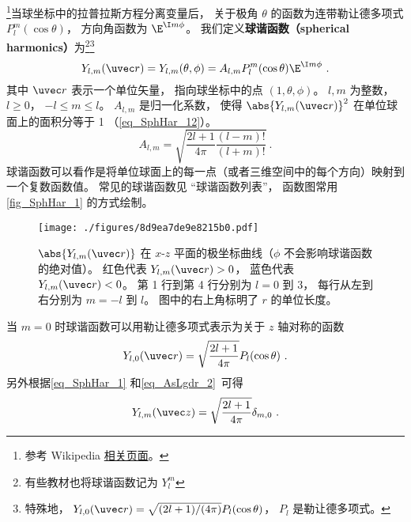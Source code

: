 

\footnote{参考 Wikipedia \href{https://en.wikipedia.org/wiki/Spherical_harmonics}{相关页面}。}当球坐标中的拉普拉斯方程分离变量后， 关于极角 $\theta$ 的函数为连带勒让德多项式 $P_l^m(\cos\theta)$， 方向角函数为 $\E^{\I m\phi}$。 我们定义\textbf{球谐函数（spherical harmonics）}为\footnote{有些教材也将球谐函数记为 $Y_l^m$}\footnote{特殊地， $Y_{l,0}(\uvec r) = \sqrt{(2l + 1)/(4\pi)}P_l(\cos\theta)$， $P_l$ 是勒让德多项式。}
\begin{equation}\label{eq_SphHar_1}
Y_{l, m} (\uvec r) = Y_{l, m}(\theta, \phi) = A_{l,m} P_l^m(\cos \theta) \E^{\I m\phi}~.
\end{equation}
其中 $\uvec r$ 表示一个单位矢量， 指向球坐标中的点 $(1, \theta, \phi)$。 $l, m$ 为整数， $l \geqslant 0$， $-l \leqslant m \leqslant l$。 $A_{l,m}$ 是归一化系数， 使得 $\abs{Y_{l, m} (\uvec r)}^2$ 在单位球面上的面积分等于 1 （\autoref{eq_SphHar_12}）。
\begin{equation}\label{eq_SphHar_2}
A_{l,m} =  \sqrt{\frac{2l + 1}{4\pi }\frac{(l - m)!}{(l + m)!}}~.
\end{equation}
球谐函数可以看作是将单位球面上的每一点（或者三维空间中的每个方向）映射到一个复数函数值。 常见的球谐函数见 “球谐函数列表”， 函数图常用\autoref{fig_SphHar_1} 的方式绘制。

\begin{figure}[ht]
\centering
\texttt{[image: ./figures/8d9ea7de9e8215b0.pdf]}
\caption{$\abs{Y_{l,m}(\uvec r)}$ 在 $x$-$z$ 平面的极坐标曲线（$\phi$ 不会影响球谐函数的绝对值）。 红色代表 $Y_{l,m}(\uvec r) > 0$， 蓝色代表 $Y_{l,m}(\uvec r) < 0$。 第 1 行到第 4 行分别为 $l = 0$ 到 $3$， 每行从左到右分别为 $m = -l$ 到 $l$。 图中的右上角标明了 $r$ 的单位长度。} \label{fig_SphHar_1}
\end{figure}

当 $m = 0$ 时球谐函数可以用勒让德多项式表示为关于 $z$ 轴对称的函数
\begin{equation}\label{eq_SphHar_11}
Y_{l,0}(\uvec r) = \sqrt{\frac{2l+1}{4\pi}} P_l(\cos\theta)~.
\end{equation}
另外根据\autoref{eq_SphHar_1} 和\autoref{eq_AsLgdr_2}~可得
\begin{equation}
Y_{l,m}(\uvec z) = \sqrt{\frac{2l+1}{4\pi}} \delta_{m,0}~.
\end{equation}

